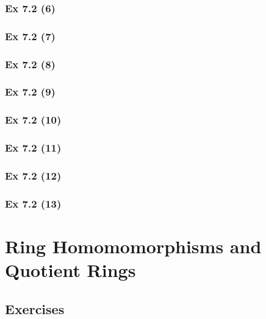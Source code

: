 \subsubsection{Ex 7.2 (6)}\label{sec:Ex_7.2.6}

\subsubsection{Ex 7.2 (7)}\label{sec:Ex_7.2.7}

\subsubsection{Ex 7.2 (8)}\label{sec:Ex_7.2.8}

\subsubsection{Ex 7.2 (9)}\label{sec:Ex_7.2.9}

\subsubsection{Ex 7.2 (10)}\label{sec:Ex_7.2.10}

\newpage		%

\subsubsection{Ex 7.2 (11)}\label{sec:Ex_7.2.11}

\subsubsection{Ex 7.2 (12)}\label{sec:Ex_7.2.12}

\subsubsection{Ex 7.2 (13)}\label{sec:Ex_7.2.13}

\newpage		%

\section{Ring Homomomorphisms and Quotient Rings}\label{sec:7.3}	
\subsection*{Exercises}\label{sec:7.3_Exercises}

